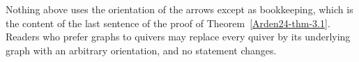 \begin{remark}\label{Arden24-rem-4.1}
\label{Arden24-rem:orientation}
Nothing above uses the orientation of the arrows except as bookkeeping, which is the content of the last sentence of the proof of Theorem~\ref{Arden24-thm-3.1}. Readers who prefer graphs to quivers may replace every quiver by its underlying graph with an arbitrary orientation, and no statement changes.
\end{remark}